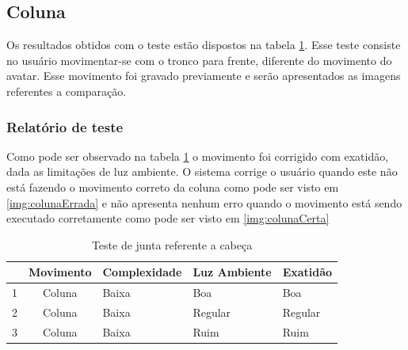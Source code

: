   \subsection{Coluna}\label{sub:coluna}
  Os resultados obtidos com o teste estão dispostos na tabela \ref{tab:coluna}. Esse teste consiste no usuário movimentar-se com o tronco para frente, diferente do movimento do avatar. Esse movimento
  foi gravado previamente e serão apresentados as imagens referentes a comparação.

  \subsubsection{Relatório de teste}\label{sub:coluna}
  Como pode ser observado na tabela \ref{tab:coluna} o movimento foi corrigido com exatidão, dada as limitações de luz ambiente. O sistema corrige o usuário quando este
  não está fazendo o movimento correto da coluna como pode ser visto em \ref{img:colunaErrada} e não apresenta nenhum erro quando o movimento está sendo executado
  corretamente como pode ser visto em \ref{img:colunaCerta}

  \begin{table}[H]
  \centering
  \caption{Teste de junta referente a cabeça}
  \label{tab:coluna}
  \begin{tabular}{@{}|c|c|l|l|l|@{}}
  \toprule
  \multicolumn{1}{|l|}{ } & \multicolumn{1}{l|}{\textbf{Movimento}} & \textbf{Complexidade} & \textbf{Luz Ambiente} & \textbf{Exatidão} \\ \midrule
  1                                 & Coluna                     & Baixa                 & Boa                   & Boa               \\ \midrule
  2                                 & Coluna                     & Baixa                 & Regular               & Regular           \\ \midrule
  3                                 & Coluna                     & Baixa                 & Ruim                  & Ruim              \\ \bottomrule
  \end{tabular}
  \end{table}

